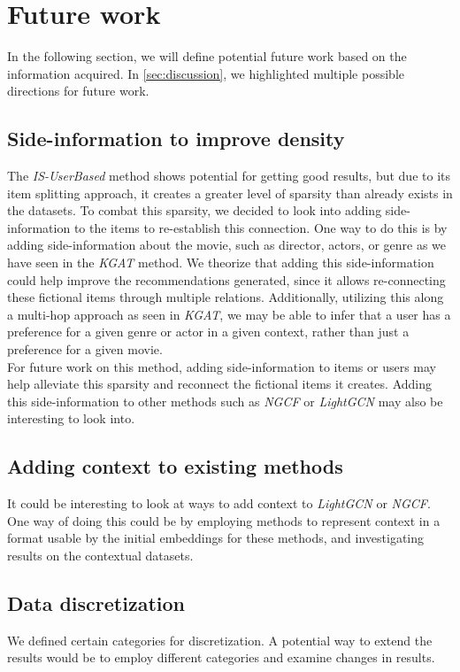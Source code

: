 \section{Future work}\label{sec:futurework}
In the following section, we will define potential future work based on the information acquired.
In \cref{sec:discussion}, we highlighted multiple possible directions for future work.

\subsection{Side-information to improve density}
The \textit{IS-UserBased} method shows potential for getting good results, but due to its item splitting approach, it creates a greater level of sparsity than already exists in the datasets.
To combat this sparsity, we decided to look into adding side-information to the items to re-establish this connection.
One way to do this is by adding side-information about the movie, such as director, actors, or genre as we have seen in the \textit{KGAT} method.
We theorize that adding this side-information could help improve the recommendations generated, since it allows re-connecting these fictional items through multiple relations.
Additionally, utilizing this along a multi-hop approach as seen in \textit{KGAT}, we may be able to infer that a user has a preference for a given genre or actor in a given context, rather than just a preference for a given movie.\\
For future work on this method, adding side-information to items or users may help alleviate this sparsity and reconnect the fictional items it creates.
Adding this side-information to other methods such as \textit{NGCF} or \textit{LightGCN} may also be interesting to look into.

\subsection{Adding context to existing methods}
It could be interesting to look at ways to add context to \textit{LightGCN} or \textit{NGCF}.
One way of doing this could be by employing methods to represent context in a format usable by the initial embeddings for these methods, and investigating results on the contextual datasets.

\subsection{Data discretization}
We defined certain categories for discretization.
A potential way to extend the results would be to employ different categories and examine changes in results.

